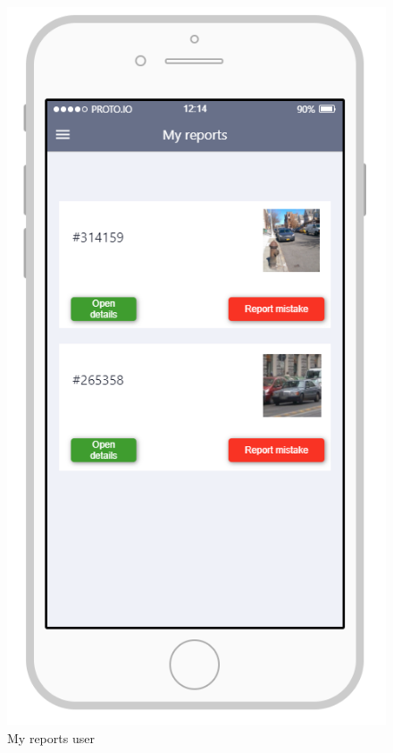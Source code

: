 \documentclass{article}
\begin{document}
\begin{figure}[H]
    \centering
    \includegraphics[scale=0.7]{Images/MyReportsApp}
    \caption{My reports user}
\end{figure}
\end{document}
